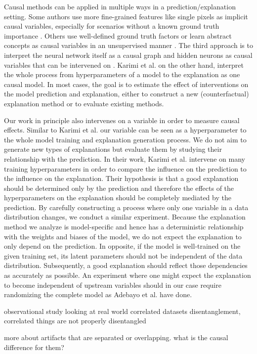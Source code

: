 Causal methods can be applied in multiple ways in a prediction/explanation setting.
Some authors use more fine-grained features like single pixels as implicit causal variables, especially for scenarios without a known ground truth importance \cite{Zeiler2013,Fong2017,Samek2017a}. Others use well-defined ground truth factors or learn abstract concepts as causal variables in an unsupervised manner \cite{Goyal2019, Tran2022, Reimers2019, Reimers2020, Harradon2018}. The third approach is to interpret the neural network itself as a causal graph and hidden neurons as causal variables that can be intervened on \cite{Narendra2018, Chattopadhyay2019}. Karimi et al. \cite{Karimi2023} on the other hand, interpret the whole process from hyperparameters of a model to the explanation as one causal model. In most cases, the goal is to estimate the effect of interventions on the model prediction and explanation, either to construct a new (counterfactual) explanation method or to evaluate existing methods.

Our work in principle also intervenes on a variable in order to measure causal effects. Similar to Karimi et al. \cite{Karimi2023} our variable can be seen as a hyperparameter to the whole model training and explanation generation process. We do not aim to generate new types of explanations but evaluate them by studying their relationship with the prediction. In their work, Karimi et al. intervene on many training hyperparameters in order to compare the influence on the prediction to the influence on the explanation. Their hypothesis is that a good explanation should be determined only by the prediction and therefore the effects of the hyperparameters on the explanation should be completely mediated by the prediction. By carefully constructing a process where only one variable in a data distribution changes, we conduct a similar experiment. Because the explanation method we analyze is model-specific and hence has a deterministic relationship with the weights and biases of the model, we do not expect the explanation to only depend on the prediction. In opposite, if the model is well-trained on the given training set, its latent parameters should not be independent of the data distribution. Subsequently, a good explanation should reflect those dependencies as accurately as possible. An experiment where one might expect the explanation to become independent of upstream variables should in our case require randomizing the complete model as Adebayo et al. \cite{Adebayo2018} have done. 

{\color{gray}
observational study looking at real world correlated datasets disentanglement, correlated things are not properly disentangled \cite{Traeuble2021} 

more about artifacts that are separated or overlapping. what is the causal difference for them? 
}